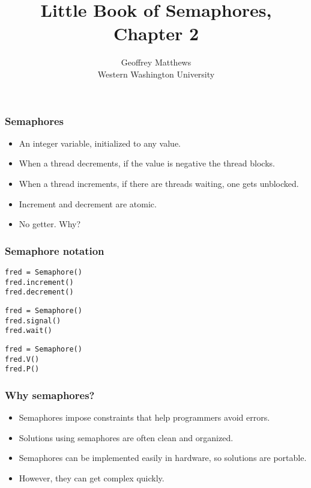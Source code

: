 \documentclass{beamer}
\title{Little Book of Semaphores, Chapter 2}
\author{Geoffrey Matthews\\
\small Western Washington University}
\newcommand{\bi}{\begin{itemize}}
\newcommand{\ii}{\item}
\newcommand{\ei}{\end{itemize}}
\newcommand{\bfr}[1]{\begin{frame}[fragile]\frametitle{{ #1 }}}
\begin{document}
\maketitle

\bfr{Semaphores}
\bi
\ii An integer variable, initialized to any value.
\ii When a thread decrements, if the value is negative the thread blocks.
\ii When a thread increments, if there are threads waiting, one gets unblocked.
\pause
\ii Increment and decrement are atomic.
\pause
\ii No getter.  Why?
\ei
\end{frame}

\bfr{Semaphore notation}

\begin{Verbatim}
fred = Semaphore()
fred.increment()
fred.decrement()
\end{Verbatim}
\begin{Verbatim}
fred = Semaphore()
fred.signal()
fred.wait()
\end{Verbatim}
\begin{Verbatim}
fred = Semaphore()
fred.V()
fred.P()
\end{Verbatim}

\end{frame}
\bfr{Why semaphores?}
\bi
\ii Semaphores impose constraints that help programmers avoid errors.
\ii Solutions using semaphores are often clean and organized.
\ii Semaphores can be implemented easily in hardware, so solutions are
portable.  \pause
\ii However, they can get complex quickly.
\ei
\end{frame}
\end{document}

